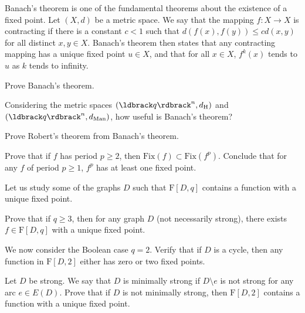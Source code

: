 \documentclass[a4paper, 11pt]{book}
\numberwithin{equation}{section}
\theoremstyle{plain}
\newcommand{\degree}{d}
\newcommand{\inn}[1]{#1_\mathrm{in}}
\newcommand{\out}[1]{#1_\mathrm{out}}
\newcommand{\dIn}{\inn{\degree}}
\newcommand{\dOut}{\out{\degree}}
\newcommand{\functions}{\mathrm{F}}
\newcommand{\Fix}{\mathrm{Fix}}
\newcommand{\dH}{d_\mathrm{H}}
\newcommand{\dManhattan}{d_{\mathrm{Man}}}
\renewcommand{\(}{\ldbrack}
\renewcommand{\)}{\rdbrack}
\begin{document}
\begin{exercises}


\item \label{exerc:Banach_yields_Robert} Banach's theorem is one of the fundamental theorems about the existence of a fixed point. Let $(X,d)$ be a metric space.  We say that the mapping $f: X \to X$ is contracting if there is a constant $c < 1$ such that $d(f(x), f(y)) \le c d(x,y)$ for all distinct $x,y \in X$. Banach's theorem then states that any contracting mapping has a unique fixed point $u \in X$, and that for all $x \in X$, $f^k(x)$ tends to $u$ as $k$ tends to infinity.
\begin{exercises}
	\item Prove Banach's theorem.

	\item Considering the metric spaces $(\(q\)^n, \dH)$ and $(\(q\)^n, \dManhattan)$, how useful is Banach's theorem?

	\item Prove Robert's theorem from Banach's theorem. 
\end{exercises}


\item Prove that if $f$ has period $p \ge 2$, then $\Fix(f) \subset \Fix(f^p)$. Conclude that for any $f$ of period $p \ge 1$, $f^p$ has at least one fixed point.

\item Let us study some of the graphs $D$ such that $\functions[D,q]$ contains a function with a unique fixed point.
\begin{exercises}
	\item Prove that if $q \ge 3$, then for any graph $D$ (not necessarily strong), there exists $f \in \functions[D,q]$ with a unique fixed point.

	\item We now consider the Boolean case $q=2$. Verify that if $D$ is a cycle, then any function in $\functions[D,2]$ either has zero or two fixed points. 

	\item Let $D$ be strong. We say that $D$ is minimally strong if $D \setminus e$ is not strong for any arc $e \in E(D)$. Prove that if $D$ is not minimally strong, then $\functions[D,2]$ contains a function with a unique fixed point.

\end{exercises}



\end{exercises}
\end{document}
